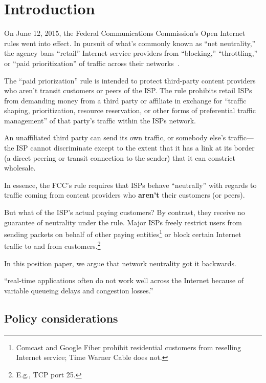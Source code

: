 \section{Introduction}

\label{sec:intro}

On June 12, 2015, the Federal Communications Commission's Open
Internet rules went into effect. In pursuit of what's commonly known
as ``net neutrality,'' the agency bans ``retail'' Internet service
providers from ``blocking,'' ``throttling,'' or ``paid
prioritization'' of traffic across their networks~\cite{openinternet}.

The ``paid priorization'' rule is intended to protect third-party
content providers who aren't transit customers or peers of the
ISP. The rule prohibits retail ISPs from demanding money from a third
party or affiliate in exchange for ``traffic shaping, prioritization,
resource reservation, or other forms of preferential traffic
management'' of that party's traffic within the ISPs network.

An unaffiliated third party can send its own traffic, or somebody
else's traffic---the ISP cannot discriminate except to the extent that
it has a link at its border (a direct peering or transit connection to
the sender) that it can constrict wholesale.

In essence, the FCC's rule requires that ISPs behave ``neutrally''
with regards to traffic coming from content providers who
\textbf{aren't} their customers (or peers).

But what of the ISP's actual paying customers? By contrast, they
receive no guarantee of neutrality under the rule. Major ISPs freely
restrict users from sending packets on behalf of other paying
entities\footnote{Comcast and Google Fiber prohibit residential
  customers from reselling Internet service; Time Warner Cable does
  not.} or block certain Internet traffic to and from
customers.\footnote{E.g., TCP port 25.}

In this position paper, we argue that network neutrality got it backwards.



``real-time applications often do not work well across the Internet
because of variable queueing delays and congestion losses.''\cite{rfc1633}

\subsection{Policy considerations}
